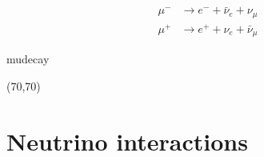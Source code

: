 \begin{minipage}[c][3cm][c]{0.5\textwidth}
	\centering
	\begin{align}
		\label{eq:mupdecay}
		\mu^- &\rightarrow e^- + \bar\nu_e + \nu_\mu \\
		\label{eq:mundecay}
		\mu^+ &\rightarrow e^+ + \nu_e + \bar\nu_\mu
	\end{align}
\end{minipage}
%
\begin{minipage}[c][3.5cm][c]{0.5\textwidth}
	\centering
	\begin{fmffile}{mudecay}
		\begin{fmfgraph*}(70,70)
		\end{fmfgraph*}
	\end{fmffile}
\end{minipage}





\section{Neutrino interactions}
\label{sec:neutrino_interactions}

